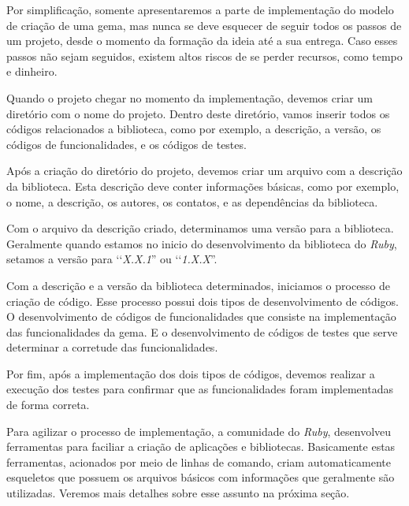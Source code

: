 Por simplificação, somente apresentaremos a parte de implementação do modelo de criação de uma
gema, mas nunca se deve esquecer de seguir todos os passos de um projeto, desde o momento da formação da
ideia até a sua entrega. Caso esses passos não sejam seguidos, existem altos riscos de se perder recursos,
como tempo e dinheiro.

Quando o projeto chegar no momento da implementação, devemos criar um diretório com o nome do projeto.
Dentro deste diretório, vamos inserir todos os códigos relacionados a biblioteca, como por exemplo, a
descrição, a versão, os códigos de funcionalidades, e os códigos de testes.

Após a criação do diretório do projeto, devemos criar um arquivo com a descrição da biblioteca. Esta
descrição deve conter informações básicas, como por exemplo, o nome, a descrição, os autores, os
contatos, e as dependências da biblioteca.

Com o arquivo da descrição criado, determinamos uma versão para a biblioteca. Geralmente quando
estamos no inicio do desenvolvimento da biblioteca do \emph{Ruby}, setamos a versão para
‘‘\emph{X.X.1}'' ou ‘‘\emph{1.X.X}''.

Com a descrição e a versão da biblioteca determinados, iniciamos o processo de criação de código.
Esse processo possui dois tipos de desenvolvimento de códigos. O desenvolvimento de códigos de
funcionalidades que consiste na implementação das funcionalidades da gema. E o desenvolvimento
de códigos de testes que serve determinar a corretude das funcionalidades.

Por fim, após a implementação dos dois tipos de códigos, devemos realizar a execução dos testes
para confirmar que as funcionalidades foram implementadas de forma correta.

Para agilizar o processo de implementação, a comunidade do \emph{Ruby}, desenvolveu ferramentas para
faciliar a criação de aplicações e bibliotecas. Basicamente estas ferramentas, acionados por meio de
linhas de comando, criam automaticamente esqueletos que possuem os arquivos básicos com informações
que geralmente são utilizadas. Veremos mais detalhes sobre esse assunto na próxima seção.

